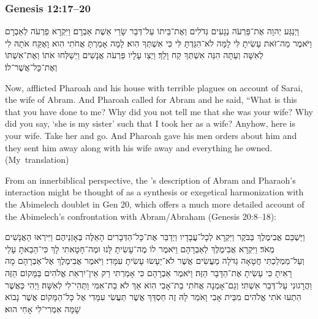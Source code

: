 \subsubsection{Genesis 12:17--20}
\begin{hebrewtext}
    ‏וַיְנַגַּע יְהוָה אֶת־פַּרְעֹה נְגָעִים גְּדֹלִים וְאֶת־בֵּיתוֹ עַל־דְּבַר שָׂרַי אֵשֶׁת אַבְרָם׃
    וַיִּקְרָא פַרְעֹה לְאַבְרָם וַיֹּאמֶר מַה־זֹּאת עָשִׂיתָ לִּי לָמָּה לֹא־הִגַּדְתָּ לִּי כִּי אִשְׁתְּךָ הִוא׃
    לָמָה אָמַרְתָּ אֲחֹתִי הִוא וָאֶקַּח אֹתָהּ לִי לְאִשָּׁה וְעַתָּה הִנֵּה אִשְׁתְּךָ קַח וָלֵךְ׃ 
    וַיְצַו עָלָיו פַּרְעֹה אֲנָשִׁים וַיְשַׁלְּחוּ אֹתוֹ וְאֶת־אִשְׁתּוֹ וְאֶת־כָּל־אֲשֶׁר־לוֹ׃
\end{hebrewtext}

\begin{translation}
    Now, \yahweh afflicted Pharoah and his house with terrible plagues on account of Sarai, the wife of Abram. 
    And Pharoah called for Abram and he said, ``What is this that you have done to me? Why did you not tell me that she was your wife? 
    Why did you say, `she is my sister' such that I took her as a wife? Anyhow, here is your wife. Take her and go. 
    And Pharoah gave his men orders about him and they sent him away along with his wife away and everything he owned. (My~translation)
\end{translation}

From an innerbiblical perspective, the \ga's description of Abram and Pharaoh's interaction might be thought of as a synthesis or exegetical harmonization with the Abimelech doublet in Gen 20, which offers a much more detailed account of the Abimelech's confrontation with Abram/Abraham (Genesis 20:8--18):

\begin{hebrewtext}
    וַיַּשְׁכֵּם אֲבִימֶלֶךְ בַּבֹּקֶר וַיִּקְרָא לְכָל־עֲבָדָיו וַיְדַבֵּר אֶת־כָּל־הַדְּבָרִים הָאֵלֶּה בְּאָזְנֵיהֶם וַיִּירְאוּ הָאֲנָשִׁים מְאֹד׃
    וַיִּקְרָא אֲבִימֶלֶךְ לְאַבְרָהָם וַיֹּאמֶר לוֹ מֶה־עָשִׂיתָ לָּנוּ וּמֶה־חָטָאתִי לָךְ כִּי־הֵבֵאתָ עָלַי וְעַל־מַמְלַכְתִּי חֲטָאָה גְדֹלָה מַעֲשִׂים אֲשֶׁר לֹא־יֵעָשׂוּ עָשִׂיתָ עִמָּדִי׃
    וַיֹּאמֶר אֲבִימֶלֶךְ אֶל־אַבְרָהָם מָה רָאִיתָ כִּי עָשִׂיתָ אֶת־הַדָּבָר הַזֶּה׃
    וַיֹּאמֶר אַבְרָהָם כִּי אָמַרְתִּי רַק אֵין־יִרְאַת אֱלֹהִים בַּמָּקוֹם הַזֶּה וַהֲרָגוּנִי עַל־דְּבַר אִשְׁתִּי׃
    וְגַם־אָמְנָה אֲחֹתִי בַת־אָבִי הִוא אַךְ לֹא בַת־אִמִּי וַתְּהִי־לִי לְאִשָּׁה׃
    וַיְהִי כַּאֲשֶׁר הִתְעוּ אֹתִי אֱלֹהִים מִבֵּית אָבִי וָאֹמַר לָהּ זֶה חַסְדֵּךְ אֲשֶׁר תַּעֲשִׂי עִמָּדִי אֶל כָּל־הַמָּקוֹם אֲשֶׁר נָבוֹא שָׁמָּה אִמְרִי־לִי אָחִי הוּא׃
\end{hebrewtext}

